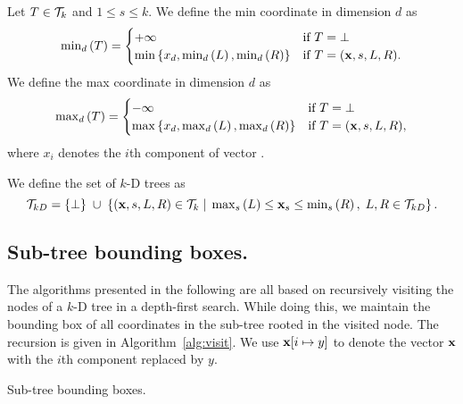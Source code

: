 \begin{definition}
\label{def:minmaxcoord}
Let $T\in\trees$ and $1 \leq s \leq k$.
We define the min coordinate in dimension $d$ as
	\begin{displaymath}
		\treemin[d]{T} =
			\begin{cases}
				+\infty & \text{if } T = \bot \\
				\min \set{ x_d, \treemin[d]{L}, \treemin[d]{R} } & \text{if } T = (\vc{x}, s, L, R).
			\end{cases}
	\end{displaymath}
We define the max coordinate in dimension $d$ as
	\begin{displaymath}
		\treemax[d]{T} =
			\begin{cases}
				-\infty & \text{if } T = \bot \\
				\max \set{ x_d, \treemax[d]{L}, \treemax[d]{R} } & \text{if } T = (\vc{x}, s, L, R),
			\end{cases}
	\end{displaymath}
where $x_i$ denotes the $i$th component of vector .
\end{definition}

\begin{definition}[$k$-D tree]
\label{def:kdtree}
We define the set of $k$-D trees as
	\begin{displaymath}
		\kdtrees =
			\set{\bot} \;\union\;
			\set{ (\vc{x}, s, L, R)\in\trees \;|\; \treemax[s]{L} \leq \vc{x}_s \leq \treemin[s]{R},\; L, R \in\kdtrees }.
	\end{displaymath}
\end{definition}


\subsection{Sub-tree bounding boxes.}
The algorithms presented in the following are all based on recursively visiting the nodes of a $k$-D tree in a depth-first search.
While doing this, we maintain the bounding box of all coordinates in the sub-tree rooted in the visited node.
The recursion is given in Algorithm~\ref{alg:visit}.
We use $\vc{x}[i \mapsto y]$ to denote the vector $\vc{x}$ with the $i$th component replaced by $y$.
\begin{algorithm}[h]
  \DontPrintSemicolon
  \BlankLine
  \caption{Sub-tree bounding boxes.}
  \label{alg:visit}
\end{algorithm}

